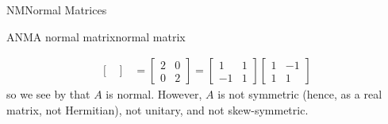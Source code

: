 \begin{subsect}{NM}{Normal Matrices}
\begin{example}{ANM}{A normal matrix}{normal matrix}
\begin{para}
\begin{align*}
\begin{bmatrix}
\end{bmatrix}
&=
\begin{bmatrix}
2 & 0\\0 & 2
\end{bmatrix}
=
\begin{bmatrix}
1 & 1\\-1 & 1
\end{bmatrix}
\begin{bmatrix}
1 & -1\\1 & 1
\end{bmatrix}
%
\end{align*}
%
so we see by  that $A$ is normal.  However, $A$ is not symmetric (hence, as a real matrix, not Hermitian), not unitary, and not skew-symmetric.\end{para}
%
\end{example}
%
\end{subsect}
%
